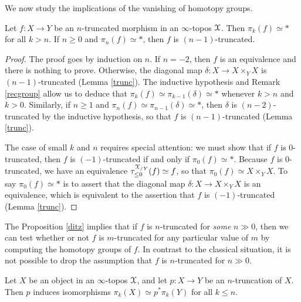 We now study the implications of the vanishing of homotopy groups.

\begin{proposition}\label{ditz}
Let $f: X \rightarrow Y$ be an $n$-truncated morphism in an $\infty$-topos $\operatorname{\mathcal{X}}$. Then
$\pi_{k}(f) \simeq \ast$ for all $k > n$. If $n \geq 0$ and $\pi_{n}(f)
\simeq \ast$, then $f$ is $(n-1)$-truncated.
\end{proposition}

\begin{proof}
The proof goes by induction on $n$. If $n = -2$, then $f$ is an
equivalence and there is nothing to prove. Otherwise, the diagonal map
$\delta: X \rightarrow X \times_Y X$ is $(n-1)$-truncated (Lemma \ref{trunc}). The
inductive hypothesis and Remark \ref{recgroup}
allow us to deduce that $\pi_{k}(f) \simeq \pi_{k-1}(\delta) \simeq \ast$ whenever $k > n$ and $k > 0$. Similarly, if $n \geq 1$ and $\pi_{n}(f) \simeq \pi_{n-1}(\delta) \simeq \ast$, then $\delta$ is
$(n-2)$-truncated by the inductive hypothesis, so that $f$ is
$(n-1)$-truncated (Lemma \ref{trunc}). 

The case of small $k$ and $n$ requires special attention: we must
show that if $f$ is $0$-truncated, then $f$ is $(-1)$-truncated if
and only if $\pi_0(f) \simeq \ast$. Because $f$ is $0$-truncated, we have
an equivalence $\tau_{\leq 0}^{\operatorname{\mathcal{X}}_{/Y}}(f) \simeq f$, so that $\pi_0(f) \simeq X
\times_Y X$. To say $\pi_0(f) \simeq \ast$ is to assert that the diagonal map
$\delta: X \rightarrow X \times_{Y} X$ is an equivalence, which is equivalent
to the assertion that $f$ is $(-1)$-truncated (Lemma \ref{trunc}). 
\end{proof}

\begin{remark}
The Proposition \ref{ditz} implies that if $f$ is $n$-truncated
for {\em some} $n \gg 0$, then we can test whether or not $f$ is
$m$-truncated for any particular value of $m$ by computing the
homotopy groups of $f$. In contrast to the classical situation, it
is not possible to drop the assumption that $f$ is
$n$-truncated for $n \gg 0$. 
\end{remark}

\begin{lemma}\label{truncatepin}
Let $X$ be an object in an $\infty$-topos $\operatorname{\mathcal{X}}$, and let
$p: X \rightarrow Y$ be an $n$-truncation of $X$. Then $p$ induces isomorphisms
$\pi_{k}(X) \simeq p^{\ast} \pi_{k}(Y)$ for all $k
\leq n$.
\end{lemma}

